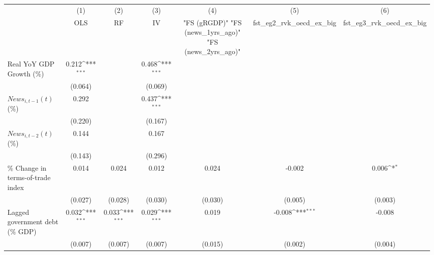 {
\def\sym#1{\ifmmode^{#1}\else\(^{#1}\)\fi}
\begin{tabular}{l*{6}{c}}
\toprule
                    &\multicolumn{1}{c}{(1)}&\multicolumn{1}{c}{(2)}&\multicolumn{1}{c}{(3)}&\multicolumn{1}{c}{(4)}&\multicolumn{1}{c}{(5)}&\multicolumn{1}{c}{(6)}\\
                    &\multicolumn{1}{c}{OLS}&\multicolumn{1}{c}{RF}&\multicolumn{1}{c}{IV}&\multicolumn{1}{c}{ "FS (gRGDP)"  "FS (news_1yrs_ago)"  "FS (news_2yrs_ago)" }&\multicolumn{1}{c}{fst_eg2_rvk_oecd_ex_big}&\multicolumn{1}{c}{fst_eg3_rvk_oecd_ex_big}\\
\midrule
Real YoY GDP Growth (\%)&       0.212\sym{***}&                     &       0.468\sym{***}&                     &                     &                     \\
                    &     (0.064)         &                     &     (0.069)         &                     &                     &                     \\
\addlinespace
$ News_{i,t-1}(t)$ (\%)&       0.292         &                     &       0.437\sym{***}&                     &                     &                     \\
                    &     (0.220)         &                     &     (0.167)         &                     &                     &                     \\
\addlinespace
$ News_{i,t-2}(t)$ (\%)&       0.144         &                     &       0.167         &                     &                     &                     \\
                    &     (0.143)         &                     &     (0.296)         &                     &                     &                     \\
\addlinespace
\% Change in terms-of-trade index&       0.014         &       0.024         &       0.012         &       0.024         &      -0.002         &       0.006\sym{*}  \\
                    &     (0.027)         &     (0.028)         &     (0.030)         &     (0.030)         &     (0.005)         &     (0.003)         \\
\addlinespace
Lagged government debt (\% GDP)&       0.032\sym{***}&       0.033\sym{***}&       0.029\sym{***}&       0.019         &      -0.008\sym{***}&      -0.008         \\
                    &     (0.007)         &     (0.007)         &     (0.007)         &     (0.015)         &     (0.002)         &     (0.004)         \\

\end{tabular}}
